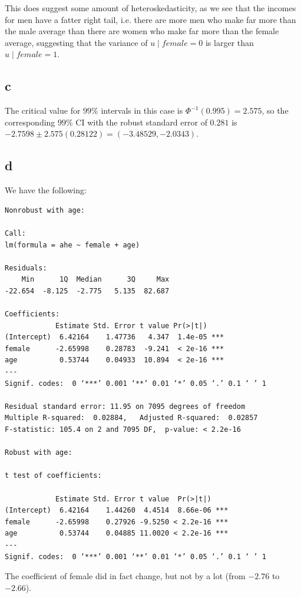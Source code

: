 \documentclass[12pt,letterpaper]{article}
\theoremstyle{definition}
\begin{document}
This does suggest some amount of heteroskedasticity, as we see that the incomes for men have a fatter right tail, i.e. there are more men who make far more than the male average than there are women who make far more than the female average, suggesting that the variance of $u \mid female = 0$ is larger than $u \mid female = 1$.

\subsection*{c}

The critical value for \(99\%\) intervals in this case is \(\Phi^{-1}(0.995) = 2.575\), so the corresponding \(99\%\) CI with the robust standard error of \(0.281\) is \(-2.7598 \pm 2.575(0.28122) = (-3.48529, -2.0343)\).

\subsection*{d}

We have the following:
\begin{Verbatim}[fontsize=\small]
Nonrobust with age:

Call:
lm(formula = ahe ~ female + age)

Residuals:
    Min      1Q  Median      3Q     Max
-22.654  -8.125  -2.775   5.135  82.687

Coefficients:
            Estimate Std. Error t value Pr(>|t|)
(Intercept)  6.42164    1.47736   4.347  1.4e-05 ***
female      -2.65998    0.28783  -9.241  < 2e-16 ***
age          0.53744    0.04933  10.894  < 2e-16 ***
---
Signif. codes:  0 ‘***’ 0.001 ‘**’ 0.01 ‘*’ 0.05 ‘.’ 0.1 ‘ ’ 1

Residual standard error: 11.95 on 7095 degrees of freedom
Multiple R-squared:  0.02884,	Adjusted R-squared:  0.02857
F-statistic: 105.4 on 2 and 7095 DF,  p-value: < 2.2e-16

Robust with age:

t test of coefficients:

            Estimate Std. Error t value  Pr(>|t|)
(Intercept)  6.42164    1.44260  4.4514  8.66e-06 ***
female      -2.65998    0.27926 -9.5250 < 2.2e-16 ***
age          0.53744    0.04885 11.0020 < 2.2e-16 ***
---
Signif. codes:  0 ‘***’ 0.001 ‘**’ 0.01 ‘*’ 0.05 ‘.’ 0.1 ‘ ’ 1
\end{Verbatim}

The coefficient of female did in fact change, but not by a lot (from \(-2.76\) to \(-2.66\)).
\end{document}
